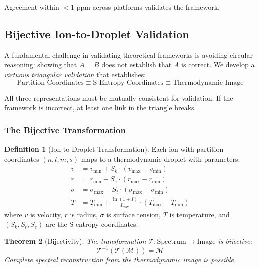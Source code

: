 \documentclass[twocolumn,10pt,a4paper]{article}
\newtheorem{theorem}{Theorem}[section]
\theoremstyle{definition}
\newtheorem{definition}[theorem]{Definition}
\theoremstyle{remark}
\newcommand{\Sk}{S_k}
\newcommand{\St}{S_t}
\newcommand{\Se}{S_e}
\begin{document}
Agreement within $<1$ ppm across platforms validates the framework.

\subsection{Bijective Ion-to-Droplet Validation}

A fundamental challenge in validating theoretical frameworks is avoiding circular reasoning: showing that $A = B$ does not establish that $A$ is correct. We develop a \emph{virtuous triangular validation} that establishes:
\begin{equation}
    \boxed{\text{Partition Coordinates} \equiv \text{S-Entropy Coordinates} \equiv \text{Thermodynamic Image}}
\end{equation}

All three representations must be mutually consistent for validation. If the framework is incorrect, at least one link in the triangle breaks.

\subsubsection{The Bijective Transformation}

\begin{definition}[Ion-to-Droplet Transformation]
Each ion with partition coordinates $(n, l, m, s)$ maps to a thermodynamic droplet with parameters:
\begin{align}
    v &= v_{\min} + \Sk \cdot (v_{\max} - v_{\min}) \\
    r &= r_{\min} + \Se \cdot (r_{\max} - r_{\min}) \\
    \sigma &= \sigma_{\max} - \St \cdot (\sigma_{\max} - \sigma_{\min}) \\
    T &= T_{\min} + \frac{\ln(1 + I)}{I_{\max}} \cdot (T_{\max} - T_{\min})
\end{align}
where $v$ is velocity, $r$ is radius, $\sigma$ is surface tension, $T$ is temperature, and $(\Sk, \St, \Se)$ are the S-entropy coordinates.
\end{definition}

\begin{theorem}[Bijectivity]
\label{thm:bijectivity}
The transformation $\mathcal{T}: \text{Spectrum} \to \text{Image}$ is bijective:
\begin{equation}
    \mathcal{T}^{-1}(\mathcal{T}(\mathcal{M})) = \mathcal{M}
\end{equation}
Complete spectral reconstruction from the thermodynamic image is possible.
\end{theorem}
\end{document}
